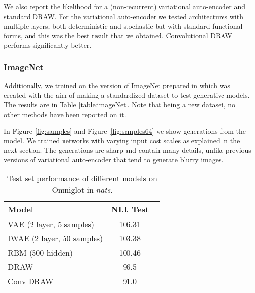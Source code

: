 \documentclass{article}
\begin{document}
We also report the likelihood for a (non-recurrent) variational auto-encoder and standard DRAW. For the variational auto-encoder we tested architectures with multiple layers, both deterministic and stochastic but with standard functional forms, and this was the best result that we obtained. Convolutional DRAW performs significantly better. 




\subsubsection{ImageNet}

Additionally, we trained on the version of ImageNet prepared in \citep{oord2016pixel} which was created with the aim of making a standardized dataset to test generative models. The results are in Table \ref{table:imageNet}. Note that being a new dataset, no other methods have been reported on it.

In Figure~\ref{fig:samples} and Figure~\ref{fig:samples64} we show generations from the model. We trained networks with varying input cost scales as explained in the next section. The generations are sharp and contain many details, unlike previous versions of variational auto-encoder that tend to generate blurry images.

\begin{table}[h]
\vspace{-0.3cm}
\caption{Test set performance of different models on  Omniglot in \emph{nats}.}
\vspace{0.4cm}
\centering
	\begin{tabular}{lcc}
		\hline
		\textbf{Model} & \textbf{NLL Test}  \\ 
		\hline
         VAE (2 layer, 5 samples) & 106.31 \\
         IWAE (2 layer, 50 samples) & 103.38 \\
         RBM (500 hidden) & 100.46 \\
		\hline
        DRAW &  96.5\\
		\hline
        Conv DRAW &  91.0\\
	   	\hline
	\end{tabular}
\label{table:omniglot}
\end{table}
\end{document}
